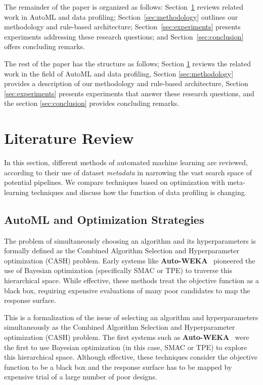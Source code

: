 \documentclass[conference]{llncs}
\begin{document}
   
   The remainder of the paper is organized as follows: Section~\ref{sec:literature} reviews related work in AutoML and data profiling; Section~\ref{sec:methodology} outlines our methodology and rule-based architecture; Section~\ref{sec:experiments} presents experiments addressing these research questions; and Section~\ref{sec:conclusion} offers concluding remarks.

   The rest of the paper has the structure as follows; Section \ref{sec:literature} reviews the related work in the field of AutoML and data profiling, Section \ref{sec:methodology} provides a description of our methodology and rule-based architecture, Section \ref{sec:experiments} presents experiments that answer these research questions, and the section \ref{sec:conclusion}  provides concluding remarks.

   \section{Literature Review}
   \label{sec:literature}

   In this section, different methods of automated machine learning are reviewed, according to their use of dataset \emph{metadata} in narrowing the vast search space of potential pipelines. We compare techniques based on optimization with meta-learning techniques and discuss how the function of data profiling is changing.

   \subsection{AutoML and Optimization Strategies}

   The problem of simultaneously choosing an algorithm and its hyperparameters is formally defined as the Combined Algorithm Selection and Hyperparameter optimization (CASH) problem. Early systems like \textbf{Auto-WEKA}~\cite{thornton2013auto} pioneered the use of Bayesian optimization (specifically SMAC or TPE) to traverse this hierarchical space. While effective, these methods treat the objective function as a black box, requiring expensive evaluations of many poor candidates to map the response surface.

   This is a formalization of the issue of selecting an algorithm and hyperparameters simultaneously as the Combined Algorithm Selection and Hyperparameter optimization (CASH) problem. The first systems such as \textbf{Auto-WEKA}~\cite{thornton2013auto} were the first to use Bayesian optimization (in this case, SMAC or TPE) to explore this hierarchical space. Although effective, these techniques consider the objective function to be a black box and the response surface has to be mapped by expensive trial of a large number of poor designs.
\end{document}
